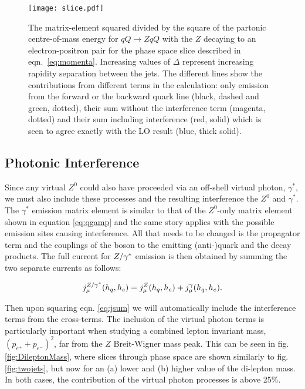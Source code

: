 		\begin{figure}[hbt]
		  \begin{center}
		    \texttt{[image: slice.pdf]}
		    \caption{The matrix-element squared divided by the square of the partonic
		      centre-of-mass energy for $qQ\to ZqQ$ with the $Z$ decaying to an
		      electron-positron pair for the phase space slice described in
		      eqn.~\eqref{eq:momenta}.  Increasing values of $\Delta$ represent
		      increasing rapidity separation between the jets.  The different lines show the contributions from
		      different terms in the calculation: only emission from the forward or the
		      backward quark line (black, dashed and green, dotted), their sum without
		      the interference term (magenta, dotted) and their sum including
		      interference (red, solid) which is seen to agree exactly with the LO result
		      (blue, thick solid).}
		    \label{fig:twojets}
		  \end{center}
		\end{figure}

	\subsection{Photonic Interference}

		Since any virtual $Z^0$ could also have proceeded via an off-shell virtual photon,
		$\gamma^*$, we must also include these processes and the resulting interference the
		$Z^0$ and $\gamma^*$.\\
		The $\gamma^*$ emission matrix element is similar to that of the $Z^0$-only matrix
		element shown in equation \eqref{eq:qgamp} and the same story applies with the
		possible emission sites causing interference.  All that needs to be changed is the
		propagator term and the couplings of the boson to the emitting (anti-)quark and
		the decay products.  The full current for $Z/\gamma^*$ emission is then obtained by summing
		the two separate currents as follows:

		\begin{align}
			\label{eq:jsum}
			j^{Z/\gamma^*}_\mu(h_q,h_e) = j^Z_\mu(h_q,h_e) + j^\gamma_\mu(h_q,h_e).
		\end{align}

		Then upon squaring eqn. \eqref{eq:jsum} we will automatically include the interference
		terms from the cross-terms. The inclusion of the virtual photon terms is particularly
		important when studying a combined lepton invariant mass, $(p_{e^+} + p_{e^-})^2$,
		far from the $Z$ Breit-Wigner mass peak. This can be seen in fig. \eqref{fig:DileptonMass},
		where slices through phase space are shown similarly to fig. \eqref{fig:twojets}, but
		now for an (a) lower and (b) higher value of the di-lepton mass.  In both cases, the
		contribution of the virtual photon processes is above 25\%.

